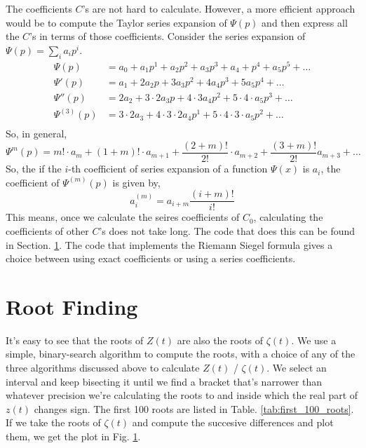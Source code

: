 \documentclass{amsproc}
\theoremstyle{definition}
\theoremstyle{remark}
\numberwithin{equation}{section}
\begin{document}
The coefficients $C$'s are not hard to calculate. However, a more efficient approach would be to compute the Taylor series expansion of $\Psi(p)$ and then express all the $C$'s in terms of those coefficients. Consider the series expansion of $\Psi(p) = \sum_i a_i p^i$. 
\begin{align*}
\Psi(p) &= a_0 + a_1 p^1 + a_2 p^2 + a_3 p^3 + a_4 + p^4 + a_5 p^5 + \ldots \\
\Psi'(p) &= a_1 + 2 a_2 p + 3 a_3 p^2 + 4 a_4 p^3 + 5 a_5 p^4 + \ldots \\
\Psi''(p) &= 2 a_2 + 3\cdot2 a_3 p + 4 \cdot 3 a_4 p^2 + 5 \cdot4 \cdot a_5 p^3 + \ldots \\
\Psi^{(3)}(p) &= 3\cdot2 a_3 + 4 \cdot 3 \cdot 2 a_4 p^1 + 5 \cdot 4 \cdot 3 \cdot a_5 p^2 + \ldots \\
\end{align*}
So, in general,
\begin{equation*}
 \Psi^{m}(p) = m! \cdot a_m + (1 + m)! \cdot a_{m + 1} + \frac{(2 + m)!}{2!} \cdot a_{m + 2} + \frac{(3 + m)!}{2!} a_{m + 3} + \ldots
\end{equation*}
So, the if the $i$-th coefficient of series expansion of a function $\Psi(x)$ is $a_i$, the coefficient of $\Psi^{(m)}(p)$ is given by, 
\begin{equation*}
 a^{(m)}_i = a_{i + m} \frac{ (i + m)! }{ i! }
\end{equation*}
This means, once we calculate the seires coefficients of $C_0$, calculating the coefficients of other $C$'s does not take long. The code that does this can be found in Section. \ref{}. The code that implements the Riemann Siegel formula gives a choice between using exact coefficients or using a series coefficients. 

\section{Root Finding}
It's easy to see that the roots of $Z(t)$ are also the roots of $\zeta(t)$. We use a simple, binary-search algorithm to compute the roots, with a choice of any of the three algorithms discussed above to calculate $Z(t)$ / $\zeta(t)$. We select an interval and keep bisecting it until we find a bracket that's narrower than whatever precision we're calculating the roots to and inside which the real part of $z(t)$ changes sign. The first 100 roots are listed in Table. \ref{tab:first_100_roots}. If we take the roots of $\zeta(t)$ and compute the succesive differences and plot them, we get the plot in Fig. \ref{}.
\end{document}

